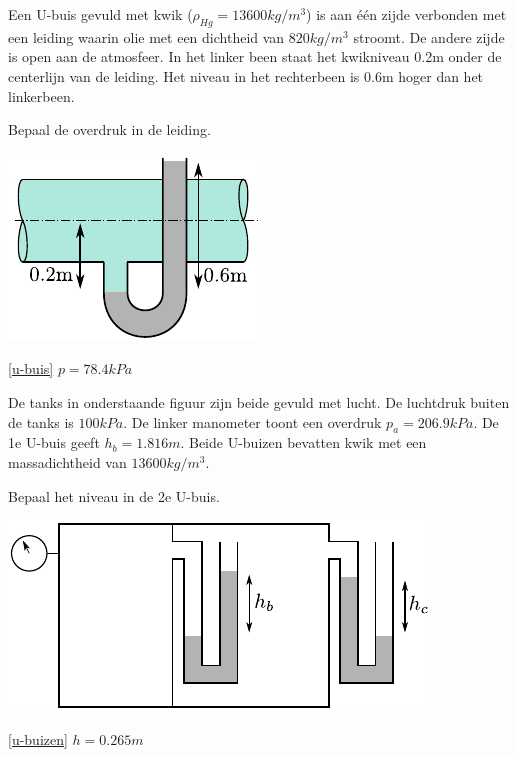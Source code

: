 \begin{toepassing}
	\label{u-buis}
Een U-buis gevuld met kwik ($\rho_{Hg}=13600\unit{kg/m^3}$) is aan één zijde verbonden met een leiding waarin olie met een dichtheid van $820\unit{kg/m^3}$ stroomt. De andere zijde is open aan de atmosfeer. In het linker been staat het kwikniveau 0.2m onder de centerlijn van de leiding. Het niveau in het rechterbeen is 0.6m hoger dan het linkerbeen.
		
Bepaal de overdruk in de leiding.

	\centering
	\includegraphics{fig/hydrostatica/u-buis}
\end{toepassing}
\begin{antwoord}{\ref{u-buis}}
	$p = 78.4\unit{kPa}$
\end{antwoord}
\begin{toepassing}
	\label{u-buizen}
De tanks in onderstaande figuur zijn beide gevuld met lucht. De luchtdruk buiten de tanks is $100\unit{kPa}$. De linker manometer toont een overdruk $p_a=206.9\unit{kPa}$. De 1e U-buis geeft $h_b=1.816\unit{m}$. Beide U-buizen bevatten kwik met een massadichtheid van $13600kg/m^3$.
		
Bepaal het niveau in de 2e U-buis.

	\centering
	\includegraphics{fig/hydrostatica/u-buizen}
\end{toepassing}
\begin{antwoord}{\ref{u-buizen}}
	$h = 0.265\unit{m}$
\end{antwoord}
